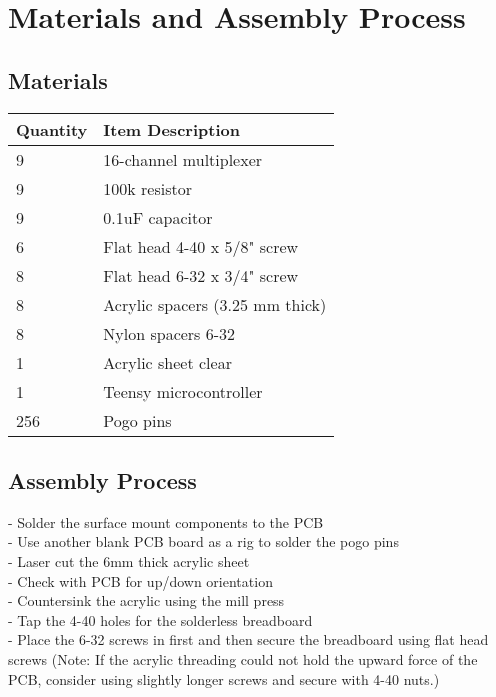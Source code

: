 \documentclass{article}
\begin{document}
\section{Materials and Assembly Process}
\begin{table}[h]
\subsection{Materials}
\begin{tabular}{|m{3cm}|m{5.25cm}|}
\hline
Quantity & Item Description \\
\hline
9 & 16-channel multiplexer \\
9 & 100k resistor \\
9 & 0.1uF capacitor \\
6 & Flat head 4-40 x 5/8" screw \\
8 & Flat head 6-32 x 3/4" screw \\
8 & Acrylic spacers (3.25 mm thick) \\
8 & Nylon spacers 6-32 \\
1 & Acrylic sheet clear \\
1 & Teensy microcontroller \\
256 & Pogo pins \\
\hline
\end{tabular}
\end{table}

\subsection{Assembly Process}
- Solder the surface mount components to the PCB \\
- Use another blank PCB board as a rig to solder the pogo pins \\
- Laser cut the 6mm thick acrylic sheet \\
- Check with PCB for up/down orientation \\
- Countersink the acrylic using the mill press \\
- Tap the 4-40 holes for the solderless breadboard \\
- Place the 6-32 screws in first and then secure the breadboard using flat head screws (Note: If the acrylic threading could not hold the upward force of the PCB, consider using slightly longer screws and secure with 4-40 nuts.) \\
\end{document}
